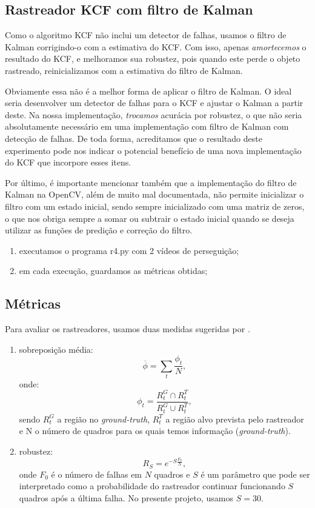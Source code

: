 \documentclass[conference]{IEEEtran}
\begin{document}
\subsection{Rastreador KCF com filtro de Kalman}
Como o algoritmo KCF não inclui um detector de falhas, usamos o filtro de Kalman corrigindo-o com a estimativa do KCF.  Com isso, apenas \textit{amortecemos} o resultado do KCF, e melhoramos sua robustez, pois quando este perde o objeto rastreado, reinicializamos com a estimativa do filtro de Kalman.

Obviamente essa não é a melhor forma de aplicar o filtro de Kalman. O ideal seria desenvolver um detector de falhas para o KCF e ajustar o Kalman a partir deste. Na nossa implementação, \textit{trocamos} acurácia por robustez, o que não seria absolutamente necessário em uma implementação com filtro de Kalman com detecção de falhas. De toda forma, acreditamos que o resultado deste experimento pode nos indicar o potencial benefício de uma nova implementação do KCF que incorpore esses itens.

Por último, é importante mencionar também que a implementação do filtro de Kalman na OpenCV, além de muito mal documentada, não permite inicializar o filtro com um estado inicial, sendo sempre inicializado com uma matriz de zeros, o que nos obriga sempre a somar ou subtrair o estado inicial quando se deseja utilizar as funções de predição e correção do filtro.
\begin{enumerate}
  \item executamos o programa r4.py com 2 vídeos de perseguição;
  \item em cada execução, guardamos as métricas obtidas;
\end{enumerate}

\subsection{Métricas}
  
Para avaliar os rastreadores, usamos duas medidas sugeridas por \cite{cehovin}.


\begin{enumerate}
  \item sobreposição média:
 \begin{equation}
    \overline{\phi} = \sum_{t}\frac{\phi_{t}}{N},
\end{equation}
onde:
\begin{equation}
    \phi_{t} = \frac{R^{G}_{t} \cap R^{T}_{t}}{R^{G}_{t} \cup R^{T}_{t}},
\end{equation} 
sendo $R^{G}_{t}$ a região no \textit{ground-truth}, $R^{T}_{t}$ a região alvo prevista pelo rastreador e N o número de quadros para os quais temos informação (\textit{ground-truth}).
  \item  robustez:
  \begin{equation}
    R_{S} = e^{-S\frac{F_{0}}{N}},
\end{equation}
onde $F_{0}$ é o número de falhas em $N$ quadros e $S$ é um parâmetro que pode ser interpretado como a probabilidade do rastreador continuar funcionando $S$ quadros após a última falha\cite{cehovin}.
No presente projeto, usamos $S=30$.
\end{enumerate}
\end{document}

